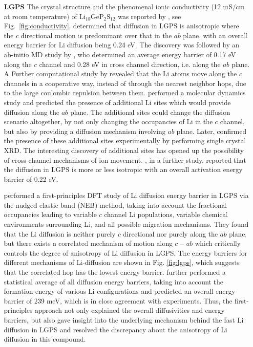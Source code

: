 \documentclass[../main.tex]{subfiles}
\begin{document}
\textbf{LGPS}
The crystal structure and the phenomenal ionic conductivity (12 mS/cm at room temperature) of Li$_{10}$GeP$_2$S$_{12}$ was reported by \citeauthor{Kamaya2011}, see Fig.~\ref{fig:conductivity}. \cite{Kamaya2011} \citeauthor{Kamaya2011} determined that diffusion in LGPS is anisotropic where the $c$ directional motion is predominant over that in the $ab$ plane, with an overall energy barrier for Li diffusion being 0.24 eV. The discovery was followed by an ab-initio MD study by \citeauthor{Mo2012}, who determined an average energy barrier of 0.17 eV along the $c$ channel and 0.28 eV in cross channel direction, i.e. along the $ab$ plane.\cite{Mo2012} A Further computational study by \citeauthor{Xu2012one} revealed that the Li atoms move along the $c$ channels in a cooperative way, instead of through the nearest neighbor hops, due to the large coulombic repulsion between them.\cite{Xu2012one} \citeauthor{Adams2012} performed a molecular dynamics study and predicted the presence of additional Li sites which would provide diffusion along the $ab$ plane.\cite{Adams2012} The additional sites could change the diffusion scenario altogether, by not only changing the occupancies of Li in the $c$ channel, but also by providing a diffusion mechanism involving $ab$ plane. Later, \citeauthor{Kuhn2013a} confirmed the presence of these additional sites experimentally by performing single crystal XRD.\cite{Kuhn2013a} The interesting discovery of additional sites has opened up the possibility of cross-channel mechanisms of ion movement. \citeauthor{Kuhn2013b}, in a further study, reported that the diffusion in LGPS is more or less isotropic with an overall activation energy barrier of 0.22 eV.\cite{Kuhn2013b}

\citeauthor{Bhandari2016} performed a first-principles DFT study of Li diffusion energy barrier in LGPS via the nudged elastic band (NEB) method, taking into account the fractional occupancies leading to variable $c$ channel Li populations, variable chemical environments surrounding Li, and all possible migration mechanisms.\cite{Bhandari2016}  They found that the Li diffusion is neither purely $c$ directional nor purely along the $ab$ plane, but there exists a correlated mechanism of motion along $c-ab$ which critically controls the degree of anisotropy of Li diffusion in LGPS. The energy barriers for different mechanisms of Li-diffusion are shown in Fig. \ref{fig:lgps}, which suggests that the correlated hop has the lowest energy barrier. %
\citeauthor{Bhandari2016} further performed a statistical average of all diffusion energy barriers, taking into account the formation energy of various Li configurations and predicted an overall energy barrier of 239 meV, which is in close agreement with experiments.\cite{Kamaya2011} Thus, the first-principles approach not only explained the overall diffusivities and energy barriers, but also gave insight into the underlying mechanism behind the fast Li diffusion in LGPS and resolved the discrepancy about the anisotropy of Li diffusion in this compound.
\end{document}
